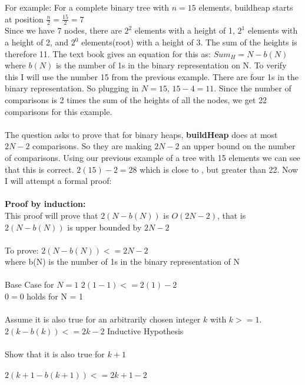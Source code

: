 \documentclass[12pt,letterpaper]{article}
\begin{document}
For example: For a complete binary tree with $n = 15$ elements, buildheap starts at position $\frac{n}{2} = \frac{15}{2} = 7$\\
Since we have 7 nodes, there are $2^2$ elements with a height of 1, $2^1$ elements with a height of 2, and $2^0$ elements(root) with a height of 3. The sum of the heights is therefore 11. The text book gives an equation for this as: $Sum_H = N - b(N)$ where  $b(N)$ is the number of 1s in the binary representation on N. To verify this I will use the number 15 from the previous example. There are four 1s in the binary representation. So plugging in $N = 15$, $15 - 4 = 11$. Since the number of comparisons is 2 times the sum of the heights of all the nodes, we get 22 comparisons for this example.\\\\
The question asks to prove that for binary heaps, \textbf{buildHeap} does at most $2N-2$ comparisons. So they are making $2N-2$ an upper bound on the number of comparisons. Using our previous example of a tree with 15 elements we can see that this is correct. $2(15) - 2 = 28$ which is close to , but greater than 22. Now I will attempt a formal proof:\\\\
\newpage
\textbf{Proof by induction:}\\
This proof will prove that $2(N - b(N))$ is $O(2N - 2)$, that is $2(N-b(N))$ is upper bounded by $2N - 2$\\\\
To prove: $2(N - b(N)) <= 2N - 2$\\ \scriptsize where b(N) is the number of 1s in the binary representation of N \small\\\\
Base Case for $N = 1$\hspace*{.25 in} $2(1 - 1) <= 2(1) - 2$\\
\hspace*{2.25 in}$0 = 0$ \hspace{.25 in} holds for N = 1\\\\
Assume it is also true for an arbitrarily chosen integer $k$ with $k >= 1$.\\
$2(k - b(k)) <= 2k - 2$ \hspace*{.5 in} Inductive Hypothesis\\\\
Show that it is also true for $k + 1$\\\\
$2(k+1 - b(k+1)) <= 2k+1 - 2$\\\\
\end{document}
